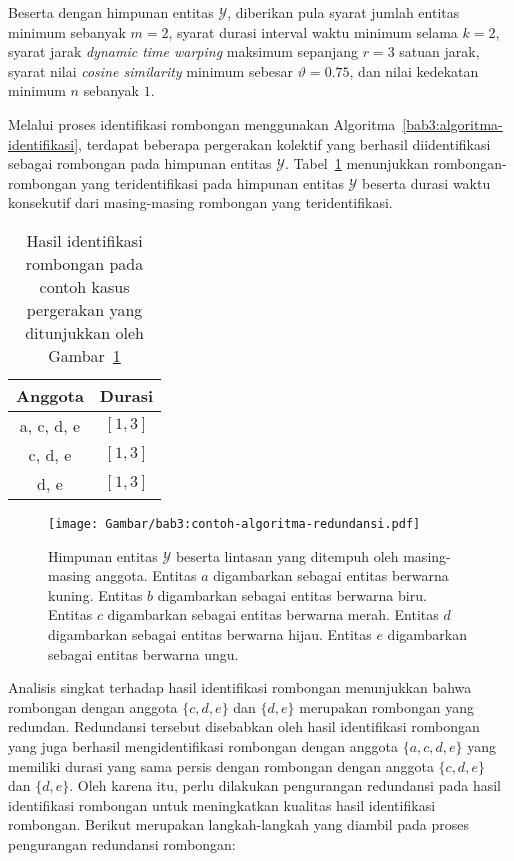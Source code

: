 Beserta dengan himpunan entitas $\mathcal{Y}$, diberikan pula syarat jumlah entitas minimum sebanyak $m = 2$, syarat durasi interval waktu minimum selama $k = 2$, syarat jarak \textit{dynamic time warping} maksimum sepanjang $r = 3$ satuan jarak, syarat nilai \textit{cosine similarity} minimum sebesar $\vartheta = 0.75$, dan nilai kedekatan minimum $n$ sebanyak $1$.

Melalui proses identifikasi rombongan menggunakan Algoritma~\ref{bab3:algoritma-identifikasi}, terdapat beberapa pergerakan kolektif yang berhasil diidentifikasi sebagai rombongan pada himpunan entitas $\mathcal{Y}$. Tabel~\ref{bab6:contoh-identifikasi-redundan} menunjukkan rombongan-rombongan yang teridentifikasi pada himpunan entitas $\mathcal{Y}$ beserta durasi waktu konsekutif dari masing-masing rombongan yang teridentifikasi.

\begin{table}[h]
    \centering
    \captionsetup{width=0.6\textwidth}
    \caption{Hasil identifikasi rombongan pada contoh kasus pergerakan yang ditunjukkan oleh Gambar~\ref{bab3:contoh-algoritma-redundansi}}
    \begin{tabular}{|c|c|}
        \hline
        Anggota & Durasi \\
        \hline
        a, c, d, e & $[1, 3]$ \\
        c, d, e & $[1, 3]$ \\
        d, e & $[1, 3]$ \\
        \hline
    \end{tabular}
    \label{bab6:contoh-identifikasi-redundan}
\end{table}

\begin{figure}[t]
    \centering
    \captionsetup{width=0.8\textwidth}
    \texttt{[image: Gambar/bab3:contoh-algoritma-redundansi.pdf]}
    \caption[Contoh proses algoritma pengurangan redundansi]{Himpunan entitas $\mathcal{Y}$ beserta lintasan yang ditempuh oleh masing-masing anggota. Entitas $a$ digambarkan sebagai entitas berwarna kuning. Entitas $b$ digambarkan sebagai entitas berwarna biru. Entitas $c$ digambarkan sebagai entitas berwarna merah. Entitas $d$ digambarkan sebagai entitas berwarna hijau. Entitas $e$ digambarkan sebagai entitas berwarna ungu.}
    \label{bab3:contoh-algoritma-redundansi}
\end{figure}

Analisis singkat terhadap hasil identifikasi rombongan menunjukkan bahwa rombongan dengan anggota $\{ c, d, e \}$ dan $\{ d, e \}$ merupakan rombongan yang redundan. Redundansi tersebut disebabkan oleh hasil identifikasi rombongan yang juga berhasil mengidentifikasi rombongan dengan anggota $\{ a, c, d, e \}$ yang memiliki durasi yang sama persis dengan rombongan dengan anggota $\{ c, d, e \}$ dan $\{ d, e \}$. Oleh karena itu, perlu dilakukan pengurangan redundansi pada hasil identifikasi rombongan untuk meningkatkan kualitas hasil identifikasi rombongan. Berikut merupakan langkah-langkah yang diambil pada proses pengurangan redundansi rombongan:

